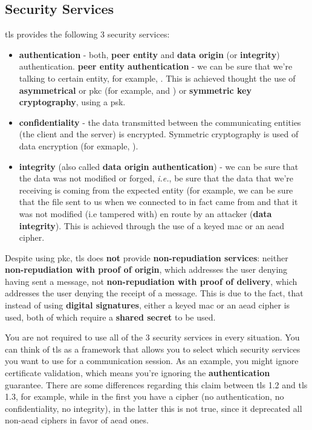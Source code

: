 \documentclass{llncs}
\begin{document}
\subsection{Security Services}
%
\gls{tls} provides the following 3 security services:
\begin{itemize}
\item \textbf{authentication} - both, \textbf{peer entity} and \textbf{data origin} (or \textbf{integrity})
authentication.
\subitem \textbf{peer entity authentication} - we can be sure that we’re talking to certain entity, for example, .
This is achieved thought the use of \textbf{asymmetrical} or \gls{pkc} (for example,  and )
or \textbf{symmetric key cryptography}, using a \gls{psk}.
\item \textbf{confidentiality} - the data transmitted between the communicating
entities (the client and the server) is encrypted. Symmetric cryptography is
used of data encryption (for exmaple, ).
\item \textbf{integrity} (also called \textbf{data origin authentication}) - we can be sure that the data was not modified or forged,
\textit{i.e.}, be sure that the data that we’re receiving is coming from the expected entity (for example, we can be sure
that the  file sent to us when we connected to  in fact
came from  and that it was not modified (i.e tampered with) en
route by an attacker (\textbf{data integrity}). This is achieved through the use
of a keyed \gls{mac} or an \gls{aead} cipher.
\end{itemize}

Despite using \gls{pkc}, \gls{tls} does \textbf{not} provide \textbf{non-repudiation services}:
neither \textbf{non-repudiation with proof of origin}, which addresses the user denying
having sent a message, not \textbf{non-repudiation with proof of delivery}, which
addresses the user denying the receipt of a message. This is due to the fact, that
instead of using \textbf{digital signatures}, either a keyed \gls{mac} or an \gls{aead}
cipher is used, both of which require a \textbf{shared secret} to be used.

You are not required to use all of the 3 security services in every situation.
You can think of \gls{tls} as a framework that allows you to select which security
services you want to use for a communication session. As an example, you might
ignore certificate validation, which means you're ignoring the \textbf{authentication}
guarantee. There are some differences regarding this claim between \gls{tls} 1.2
and \gls{tls} 1.3, for example, while in the first you have a 
cipher (no authentication, no confidentiality, no integrity), in the latter
this is not true, since it deprecated all non-\gls{aead} ciphers in favor of
\gls{aead} ones.
\end{document}
